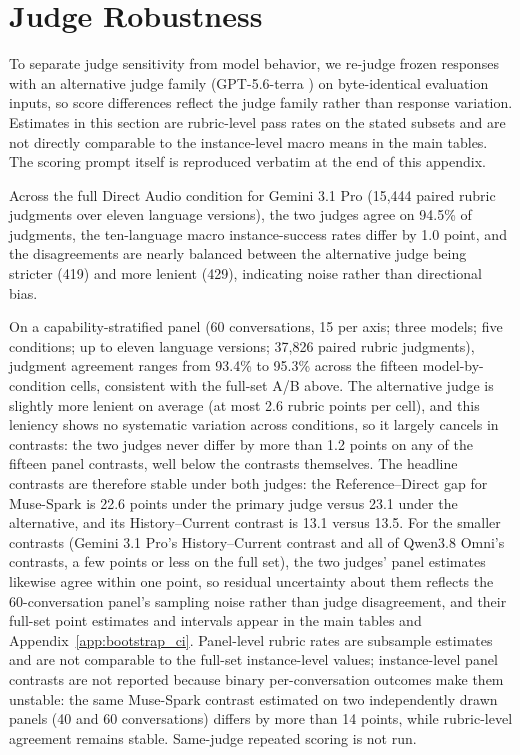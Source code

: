 \documentclass{article}
\begin{document}
\section{Judge Robustness}
\label{app:judge_robustness}

To separate judge sensitivity from model behavior, we re-judge frozen responses with an alternative judge family (GPT-5.6-terra \citep{openai2026gpt56terra}) on byte-identical evaluation inputs, so score differences reflect the judge family rather than response variation. Estimates in this section are rubric-level pass rates on the stated subsets and are not directly comparable to the instance-level macro means in the main tables. The scoring prompt itself is reproduced verbatim at the end of this appendix.

Across the full Direct Audio condition for Gemini 3.1 Pro (15{,}444 paired rubric judgments over eleven language versions), the two judges agree on 94.5\% of judgments, the ten-language macro instance-success rates differ by 1.0 point, and the disagreements are nearly balanced between the alternative judge being stricter (419) and more lenient (429), indicating noise rather than directional bias.

On a capability-stratified panel (60 conversations, 15 per axis; three models; five conditions; up to eleven language versions; 37{,}826 paired rubric judgments), judgment agreement ranges from 93.4\% to 95.3\% across the fifteen model-by-condition cells, consistent with the full-set A/B above. The alternative judge is slightly more lenient on average (at most 2.6 rubric points per cell), and this leniency shows no systematic variation across conditions, so it largely cancels in contrasts: the two judges never differ by more than 1.2 points on any of the fifteen panel contrasts, well below the contrasts themselves. The headline contrasts are therefore stable under both judges: the Reference--Direct gap for Muse-Spark is 22.6 points under the primary judge versus 23.1 under the alternative, and its History--Current contrast is 13.1 versus 13.5. For the smaller contrasts (Gemini 3.1 Pro's History--Current contrast and all of Qwen3.8 Omni's contrasts, a few points or less on the full set), the two judges' panel estimates likewise agree within one point, so residual uncertainty about them reflects the 60-conversation panel's sampling noise rather than judge disagreement, and their full-set point estimates and intervals appear in the main tables and Appendix~\ref{app:bootstrap_ci}. Panel-level rubric rates are subsample estimates and are not comparable to the full-set instance-level values; instance-level panel contrasts are not reported because binary per-conversation outcomes make them unstable: the same Muse-Spark contrast estimated on two independently drawn panels (40 and 60 conversations) differs by more than 14 points, while rubric-level agreement remains stable. Same-judge repeated scoring is not run.
\end{document}
